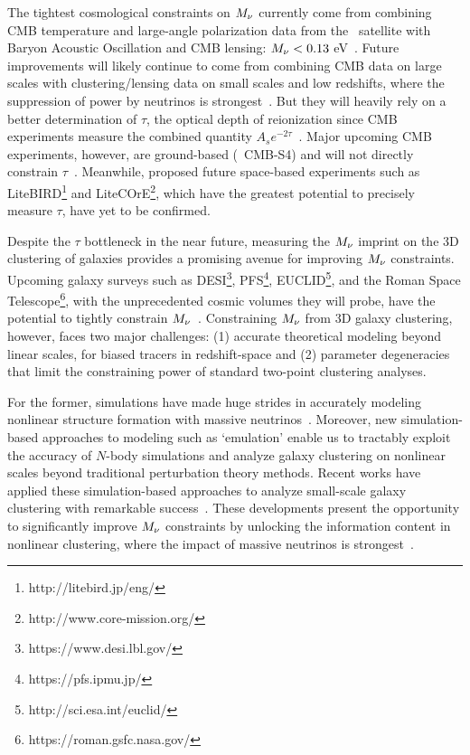 The tightest cosmological constraints on $M_\nu$ currently come from 
combining CMB temperature and large-angle polarization data from the 
\planck~satellite with Baryon Acoustic Oscillation and CMB lensing: 
$M_\nu < 0.13$ eV~\citep{planckcollaboration2018}. Future improvements
will likely continue to come from combining CMB data on large scales 
with clustering/lensing data on small scales and low redshifts, where 
the suppression of power by neutrinos is strongest~\citep{brinckmann2019}. 
But they will heavily rely on a better determination of $\tau$, the optical
depth of reionization since CMB experiments measure the combined quantity $A_s
e^{-2\tau}$~\citep{allison2015, liu2016, archidiacono2017}.
Major upcoming CMB experiments, however, are ground-based (\eg~CMB-S4) and 
will not directly constrain $\tau$~\citep{abazajian2016}. Meanwhile, proposed
future space-based experiments such as
LiteBIRD\footnote{http://litebird.jp/eng/} and 
LiteCOrE\footnote{http://www.core-mission.org/}, which have the greatest 
potential to precisely measure $\tau$, have yet to be confirmed. 

Despite the $\tau$ bottleneck in the near future, measuring the $M_\nu$ imprint 
on the 3D clustering of galaxies provides a promising avenue for improving $M_\nu$ constraints. 
Upcoming galaxy surveys such as DESI\footnote{https://www.desi.lbl.gov/}, 
PFS\footnote{https://pfs.ipmu.jp/}, EUCLID\footnote{http://sci.esa.int/euclid/}, 
and the Roman Space Telescope\footnote{https://roman.gsfc.nasa.gov/}, 
with the unprecedented cosmic volumes they will probe, 
have the potential to tightly constrain 
$M_\nu$~\citep{audren2013, font-ribera2014, petracca2016, sartoris2016, boyle2018}.
Constraining $M_\nu$ from 3D galaxy clustering, however, faces two major 
challenges: (1) accurate theoretical modeling beyond linear scales, for biased
tracers in redshift-space and (2) parameter degeneracies that limit the
constraining power of standard two-point clustering analyses. 

For the former, simulations have made huge strides in accurately modeling 
nonlinear structure formation with massive neutrinos~\citep[\eg][]{brandbyge2008, 
villaescusa-navarro2013, castorina2015, adamek2017, emberson2017, banerjee2018, 
villaescusa-navarro2018a, yoshikawa2020, villaescusa-navarro2020a}. Moreover, new simulation-based
approaches to modeling such as `emulation' enable us to tractably exploit the accuracy of 
$N$-body simulations and analyze galaxy clustering on nonlinear scales beyond
traditional perturbation theory methods. Recent works have applied
these simulation-based approaches to analyze small-scale galaxy clustering with
remarkable success~\citep[\eg][]{heitmann2009a, kwan2015, euclidcollaboration2018, lange2019, zhai2019, wibking2019}. 
These developments present the opportunity to significantly improve $M_\nu$
constraints by unlocking the information content in nonlinear clustering, where
the impact of massive neutrinos is strongest~\citep[\eg][]{brandbyge2008,
saito2008, wong2008, saito2009, viel2010a, agarwal2011, marulli2011, bird2012,
castorina2015, banerjee2016, upadhye2016, banerjee2020, allys2020, massara2020,
uhlemann2020}.

